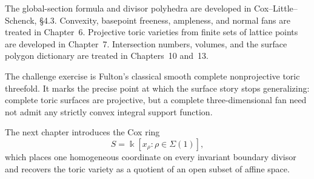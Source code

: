 The global-section formula and divisor polyhedra are developed in
Cox--Little--Schenck, \S4.3. Convexity, basepoint freeness, ampleness,
and normal fans are treated in Chapter~6. Projective toric varieties
from finite sets of lattice points are developed in Chapter~7.
Intersection numbers, volumes, and the surface polygon dictionary are
treated in Chapters~10 and~13.

The challenge exercise is Fulton's classical smooth complete
nonprojective toric threefold. It marks the precise point at which the
surface story stops generalizing: complete toric surfaces are
projective, but a complete three-dimensional fan need not admit any
strictly convex integral support function.

The next chapter introduces the Cox ring
\[
S=\Bbbk[x_\rho:\rho\in\Sigma(1)],
\]
which places one homogeneous coordinate on every invariant boundary
divisor and recovers the toric variety as a quotient of an open subset
of affine space.
